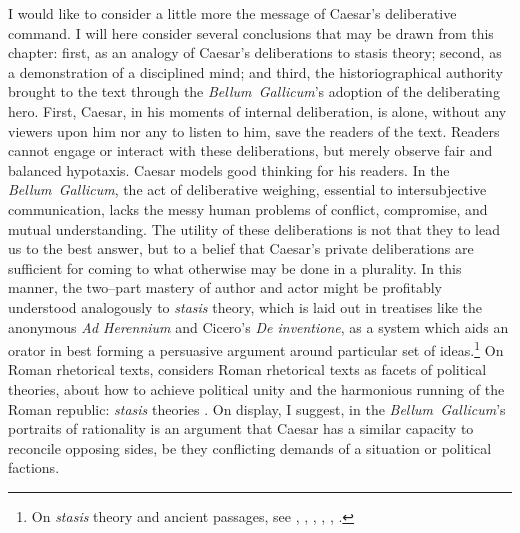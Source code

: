 \documentclass[12pt,letterpaper,oneside,final]{memoir}
\begin{document}
I would like to consider a little more the message of Caesar's deliberative command. I will here consider several conclusions that may be drawn from this chapter: first, as an analogy of Caesar's deliberations to stasis theory; second, as a demonstration of a disciplined mind; and third, the historiographical authority brought to the text through the \emph{Bellum~Gallicum}'s adoption of the deliberating hero. 
 First, Caesar, in his moments of internal deliberation, is alone, without any viewers upon him nor any to listen to him, save the readers of the text. Readers cannot engage or interact with these deliberations, but merely observe fair and balanced hypotaxis. Caesar models good thinking for his readers. In the \emph{Bellum~Gallicum}, the act of deliberative weighing, essential to intersubjective communication, lacks the messy human problems of conflict, compromise, and mutual understanding. The utility of these deliberations is not that they to lead us to the best answer, but to a belief that Caesar's private deliberations are sufficient for coming to what otherwise may be done in a plurality. In this manner, the two--part mastery of author and actor might be profitably understood analogously to \emph{stasis} theory, which is laid out in treatises like the anonymous \emph{Ad Herennium} and Cicero's \emph{De inventione}, as a system which aids an orator in best forming a persuasive argument around particular set of ideas.\footnote{On \emph{stasis} theory and ancient passages, see \textcite[39--42][on Aristotle]{solmsen1941a}, \textcite[172--178][on post--Aristotelian rhetorics]{solmsen1941b}, \textcite[pp.~13--29, 93--100, and 130--132][on Aristotle, the Hellenistic period, and Cicero, respectively]{wisse1989}, \textcite[29--32][on \emph{Ad~Her.}~and \emph{De~inv.}]{corbeill2002}, \textcite[43--49][especially on Aristotle, Isocrates, and Hermogenes]{habinek2005}, \textcite[69--76][on the \emph{Ad~Her.}~and \emph{De~inv.}]{connolly2007}.} On Roman rhetorical texts, \textcite[69--76]{connolly2007} considers Roman rhetorical texts as facets of political theories, about how to achieve political unity and the harmonious running of the Roman republic: \emph{stasis} theories . On display, I suggest, in the \emph{Bellum~Gallicum}'s portraits of rationality is an argument that Caesar has a similar capacity to reconcile opposing sides, be they conflicting demands of a situation or political factions.
\end{document}
